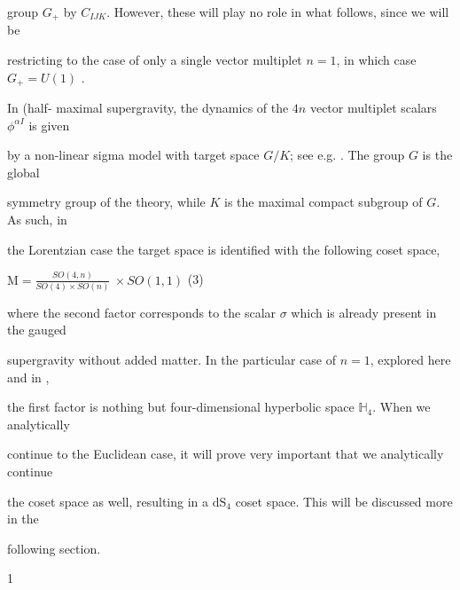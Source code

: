 \documentclass[a4paper,12pt]{article}
\begin{document}
group $G_{+}$ by $C_{IJK}$. However, these will play no role in what follows, since we will be

restricting to the case of only a single vector multiplet $n = 1$, in which case $G_{+} = U(1)$ .

In (half- maximal supergravity, the dynamics of the $4n$ vector multiplet scalars $\phi^{\alpha I}$ is given

by a non-linear sigma model with target space $G/K$; see e.g. . The group $G$ is the global

symmetry group of the theory, while $K$ is the maximal compact subgroup of $G$. As such, in

the Lorentzian case the target space is identified with the following coset space,
\begin{center}
$\displaystyle \mathrm{M}=\frac{SO(4,n)}{SO(4)\times SO(n)}\ \times SO(1,1)$   (3)
\end{center}
where the second factor corresponds to the scalar $\sigma$ which is already present in the gauged

supergravity without added matter. In the particular case of $n= 1$, explored here and in ,

the first factor is nothing but four-dimensional hyperbolic space $\mathbb{H}_{4}$. When we analytically

continue to the Euclidean case, it will prove very important that we analytically continue

the coset space as well, resulting in a $\mathrm{d}\mathrm{S}_{4}$ coset space. This will be discussed more in the

following section.

1
\end{document}
